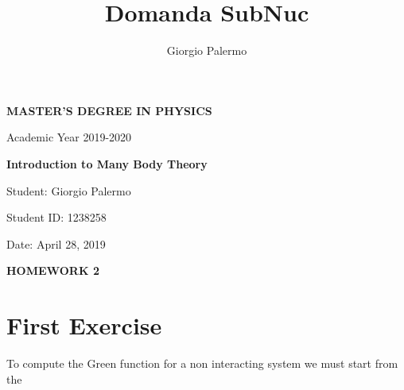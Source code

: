 \documentclass[a4paper]{article}
\title{Domanda SubNuc}
\author{Giorgio Palermo}
\begin{document}
\hypersetup{linkcolor = black}
\hypersetup{linkcolor = blue}

\begin{center}
    \textbf{MASTER'S DEGREE IN PHYSICS}
    
    Academic Year 2019-2020
    
    \medskip
    \textbf{Introduction to Many Body Theory}
\end{center}

\vspace{0.8cm}
Student: Giorgio Palermo

Student ID: 1238258

Date: April 28, 2019

\bigskip

\begin{center}
\textbf{HOMEWORK 2}
\end{center}

\section*{First Exercise}
\noindent To compute the Green function for a non interacting system we must start from the 
\end{document}
